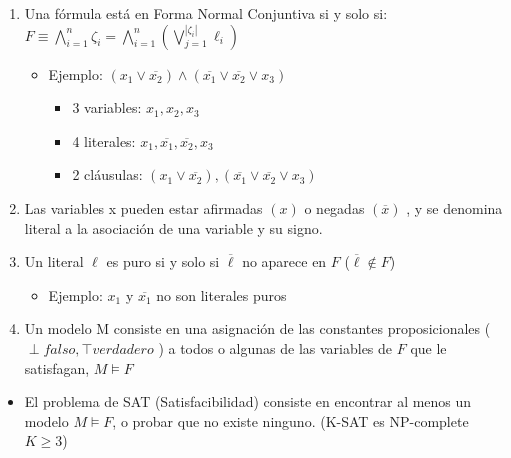 \documentclass[12pt, twoside, openright]{report} %
\begin{document}
  \begin{enumerate}

  \item
    Una fórmula está en Forma Normal Conjuntiva si y solo si:
    \(F \equiv \bigwedge_{i=1}^{n} \zeta_i= \bigwedge_{i=1}^{n} (\bigvee_{j=1}^{\left | \zeta_i \right |} \ell_i)\)
	\vspace{-0.5cm}
    \begin{itemize}
    \item Ejemplo:
      \((x_1 \vee \overline{x_2})\wedge (\overline{x_1} \vee \overline{x_2} \vee x_3)\)

      \begin{itemize}
    
      \item
        3 variables: \(x_1, x_2, x_3\)
      \item
        4 literales: \(x_1,\overline{x_1}, \overline{x_2}, x_3\)
      \item
        2 cláusulas:
        \((x_1 \vee \overline{x_2}),(\overline{x_1} \vee \overline{x_2} \vee x_3)\)
      \end{itemize}
    \end{itemize}
  \item
    Las variables x pueden estar afirmadas \((x)\) o negadas
    \((\overline{x})\) , y se denomina literal a la asociación de una
    variable y su signo.
  \item
    Un literal \(\ell\) es puro si y solo si \(\overline{\ell}\) no
    aparece en \(F\) (\(\overline{\ell} \notin F\))

    \begin{itemize}
  
    \item
      Ejemplo: \(x_1\) y \(\overline{x_1}\) no son literales puros
    \end{itemize}
  \item
    Un modelo M consiste en una asignación de las constantes
    proposicionales (\(\perp falso,\top verdadero\) ) a todos o algunas
    de las variables de \(F\) que le satisfagan, \(M \models F\)
  \end{enumerate}

  \begin{itemize}

  \item
    El problema de SAT (Satisfacibilidad) consiste en encontrar al menos
    un modelo \(M \models F\), o probar que no existe ninguno. (K-SAT es
    NP-complete \(K \geq 3\))
  \end{itemize}
  \vspace{-0.5cm}
\end{document}
